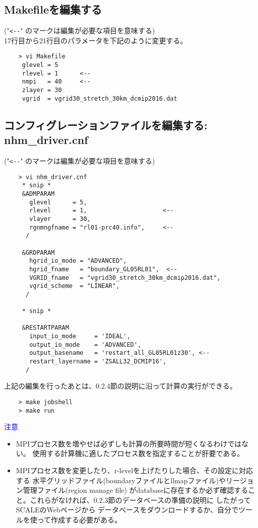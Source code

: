 \subsection{Makefileを編集する}
 ("\verb|<--|" のマークは編集が必要な項目を意味する) \\
 17行目から21行目のパラメータを下記のように変更する。
 \begin{verbatim}
    > vi Makefile
     glevel = 5
     rlevel = 1      <--
     nmpi   = 40     <--
     zlayer = 30
     vgrid  = vgrid30_stretch_30km_dcmip2016.dat
 \end{verbatim}

\subsection{コンフィグレーションファイルを編集する: nhm\_driver.cnf}
 ("\verb|<--|" のマークは編集が必要な項目を意味する)
 \begin{verbatim}
    > vi nhm_driver.cnf
     * snip *
     &ADMPARAM
       glevel      = 5,
       rlevel      = 1,                     <--
       vlayer      = 30,
       rgnmngfname = "rl01-prc40.info",     <--
      /

     &GRDPARAM
       hgrid_io_mode = "ADVANCED",
       hgrid_fname   = "boundary_GL05RL01",  <--
       VGRID_fname   = "vgrid30_stretch_30km_dcmip2016.dat",
       vgrid_scheme  = "LINEAR",
      /

     * snip *

     &RESTARTPARAM
       input_io_mode     = 'IDEAL',
       output_io_mode    = 'ADVANCED',
       output_basename   = 'restart_all_GL05RL01z30', <--
       restart_layername = 'ZSALL32_DCMIP16',
      /
 \end{verbatim}

 \noindent 上記の編集を行ったあとは、0.2.4節の説明に沿って計算の実行ができる。
 \begin{verbatim}
    > make jobshell
    > make run
 \end{verbatim}

 \noindent \textcolor{blue}{{\sf 注意}}
 \begin{itemize}
   \item MPIプロセス数を増やせば必ずしも計算の所要時間が短くなるわけではない。
           使用する計算機に適したプロセス数を指定することが肝要である。
   \item MPIプロセス数を変更したり、r-levelを上げたりした場合、その設定に対応する
           水平グリッドファイル(boundaryファイルとllmapファイル)やリージョン管理ファイル(region manage file)
           がdatabaseに存在するか必ず確認すること。これらがなければ、0.2.3節のデータベースの準備の説明に
           したがってSCALEのWebページから
           データベースをダウンロードするか、自分でツールを使って作成する必要がある。
 \end{itemize}




